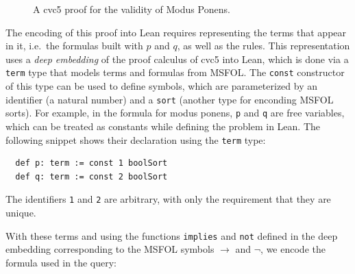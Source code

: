 \begin{figure}[t!]
  \centering
  \caption{A cvc5 proof for the validity of Modus Ponens.}
  \label{fig:cvc5-proof}
\end{figure}

The encoding of this proof into Lean requires representing the terms that appear
in it, i.e.\ the formulas built with $p$ and $q$, as well as the rules.
%
This representation uses a \emph{deep embedding} of the proof calculus of cvc5 into
Lean,
which is done via a \texttt{term} type that models terms and formulas from MSFOL.
The \texttt{const} constructor of this type can be used to define symbols,
which are parameterized by an identifier (a natural number) and a \texttt{sort}
(another type for enconding MSFOL sorts).
%
For example, in the formula for modus ponens, \texttt{p} and \texttt{q} are
free variables, which can be treated as constants while defining the problem in Lean.
The following snippet shows their declaration using the \texttt{term} type:

\begin{verbatim}
  def p: term := const 1 boolSort
  def q: term := const 2 boolSort
\end{verbatim}

The identifiers \texttt{1} and \texttt{2} are arbitrary, with only the
requirement that they are unique.

With these terms and using the functions \texttt{implies} and
\texttt{not} defined in the deep embedding corresponding to the MSFOL symbols
$\rightarrow$ and $\neg$, we encode the formula used in the
query:

